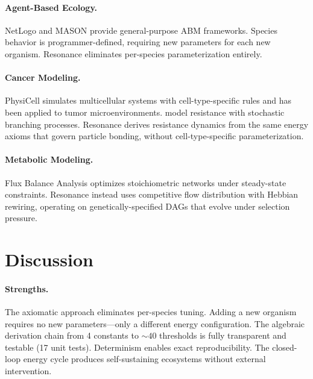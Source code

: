 \documentclass[11pt,a4paper]{article}
\begin{document}
\paragraph{Agent-Based Ecology.}
NetLogo \citep{tisue2004netlogo} and MASON
\citep{luke2005mason} provide general-purpose ABM frameworks.
Species behavior is programmer-defined, requiring new
parameters for each new organism.
Resonance eliminates per-species parameterization entirely.

\paragraph{Cancer Modeling.}
PhysiCell \citep{ghaffarizadeh2018physicell} simulates
multicellular systems with cell-type-specific rules and
has been applied to tumor microenvironments.
\citet{bozic2013evolutionary} model resistance with
stochastic branching processes.
Resonance derives resistance dynamics from the same
energy axioms that govern particle bonding, without
cell-type-specific parameterization.

\paragraph{Metabolic Modeling.}
Flux Balance Analysis \citep{orth2010flux} optimizes
stoichiometric networks under steady-state constraints.
Resonance instead uses competitive flow distribution with
Hebbian rewiring, operating on genetically-specified DAGs
that evolve under selection pressure.

\section{Discussion}
\label{sec:discussion}

\paragraph{Strengths.}
The axiomatic approach eliminates per-species tuning.
Adding a new organism requires no new parameters---only
a different energy configuration. The algebraic derivation
chain from 4 constants to ${\sim}40$ thresholds is
fully transparent and testable (17 unit tests).
Determinism enables exact reproducibility.
The closed-loop energy cycle produces self-sustaining
ecosystems without external intervention.
\end{document}
